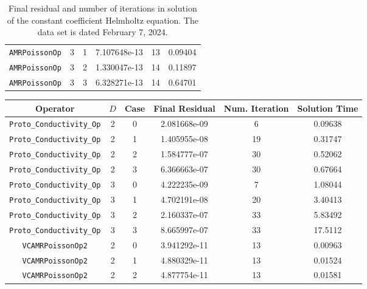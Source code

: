 \documentclass{article}
\begin{document}
\begin{small}
\begin{table}
\begin{center}
\begin{tabular}{|c|c|c|c|c||c|}
 {\tt AMRPoissonOp}               & 3   & 1    & 7.107648e-13   &  13 & 0.09404\\
 {\tt AMRPoissonOp}               & 3   & 2    & 1.330047e-13   &  14 & 0.11897\\
 {\tt AMRPoissonOp}               & 3   & 3    & 6.328271e-13   &  14 & 0.64701\\
\hline
\end{tabular}
\end{center}
\label{tab::helmholtz}
\caption
    {
      Final residual and number of iterations in solution of the  constant
      coefficient Helmholtz equation.
      The data set is dated February 7, 2024.
    }
\end{table}
\end{small}

\begin{small}
\begin{table}
\begin{center}
\begin{tabular}{|c|c|c|c|c||c|} \hline
 Operator                   & $D$ & Case & Final Residual &
 Num. Iteration & Solution Time\\
\hline
 {\tt Proto\_Conductivity\_Op}    & 2   & 0    & 2.081668e-09   & 6    & 0.09638\\
 {\tt Proto\_Conductivity\_Op}    & 2   & 1    & 1.405955e-08   & 19   & 0.31747\\
 {\tt Proto\_Conductivity\_Op}    & 2   & 2    & 1.584777e-07   & 30   & 0.52062\\
 {\tt Proto\_Conductivity\_Op}    & 2   & 3    & 6.366663e-07   & 30   & 0.67664\\
 {\tt Proto\_Conductivity\_Op}    & 3   & 0    & 4.222235e-09   & 7    & 1.08044\\
 {\tt Proto\_Conductivity\_Op}    & 3   & 1    & 4.702191e-08   & 20   & 3.40413\\
 {\tt Proto\_Conductivity\_Op}    & 3   & 2    & 2.160337e-07   & 33   & 5.83492\\
 {\tt Proto\_Conductivity\_Op}    & 3   & 3    & 8.665997e-07   & 33   & 17.5112\\
\hline                                                     
 {\tt VCAMRPoissonOp2}            & 2   & 0    & 3.941292e-11   & 13   & 0.00963\\
 {\tt VCAMRPoissonOp2}            & 2   & 1    & 4.880329e-11   & 13   & 0.01524\\
 {\tt VCAMRPoissonOp2}            & 2   & 2    & 4.877754e-11   & 13   & 0.01581\\

\end{tabular}
\end{center}
\end{table}
\end{small}
\end{document}
